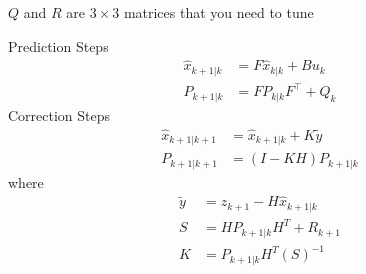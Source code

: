 \documentclass[11pt]{article}
\begin{document}
$Q$ and $R$ are $3 \times 3$ matrices that you need to tune

Prediction Steps
%
\begin{align*}
    {\hat{x}}_{k+1|k}&=F{\hat{x}}_{k|k}+Bu_k \\
    P_{k+1|k}&=FP_{k|k}F^\top+Q_k
\end{align*}
Correction Steps
%
\begin{align*}
    {\hat{x}}_{k+1|k+1}&={\hat{x}}_{k+1|k}+K\widetilde{y} \\
    P_{k+1|k+1}&=(I-KH)P_{k+1|k}
\end{align*}
%
where
%
\begin{align*}
    \widetilde{y}&=z_{k+1}-H{\hat{x}}_{k+1|k} \\
    S&=HP_{k+1|k}H^T+R_{k+1} \\
    K&=P_{k+1|k}H^T{(S)}^{-1}
\end{align*}
%
%
\MakeFooter
%
\end{document}
